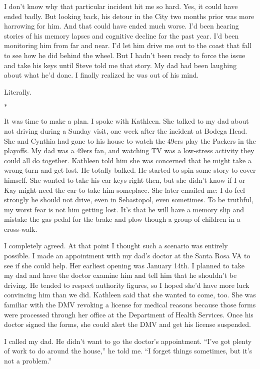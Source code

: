 \documentclass[12pt]{book}
\begin{document}
I don't know why that particular incident hit me so hard. Yes, it could have ended badly. But looking back, his detour in the City two months prior was more harrowing for him. And that could have ended much worse. I'd been hearing stories of his memory lapses and cognitive decline for the past year. I'd been monitoring him from far and near. I'd let him drive me out to the coast that fall to see how he did behind the wheel. But I hadn't been ready to force the issue and take his keys until Steve told me that story. My dad had been laughing about what he'd done. I finally realized he was out of his mind.

Literally.

\begin{center}$*$\end{center}

It was time to make a plan. I spoke with Kathleen. She talked to my dad about not driving during a Sunday visit, one week after the incident at Bodega Head. She and Cynthia had gone to his house to watch the 49ers play the Packers in the playoffs. My dad was a 49ers fan, and watching TV was a low-stress activity they could all do together. Kathleen told him she was concerned that he might take a wrong turn and get lost. He totally balked. He started to spin some story to cover himself. She wanted to take his car keys right then, but she didn't know if I or Kay might need the car to take him someplace. She later emailed me: I do feel strongly he should not drive, even in Sebastopol, even sometimes. To be truthful, my worst fear is not him getting lost. It's that he will have a memory slip and mistake the gas pedal for the brake and plow though a group of children in a cross-walk.

I completely agreed. At that point I thought such a scenario was entirely possible. I made an appointment with my dad's doctor at the Santa Rosa VA to see if she could help. Her earliest opening was January 14th. I planned to take my dad and have the doctor examine him and tell him that he shouldn't be driving. He tended to respect authority figures, so I hoped she'd have more luck convincing him than we did. Kathleen said that she wanted to come, too. She was familiar with the DMV revoking a license for medical reasons because those forms were processed through her office at the Department of Health Services. Once his doctor signed the forms, she could alert the DMV and get his license suspended.

I called my dad. He didn't want to go the doctor's appointment. ``I've got plenty of work to do around the house,'' he told me. ``I forget things sometimes, but it's not a problem.''
\end{document}
